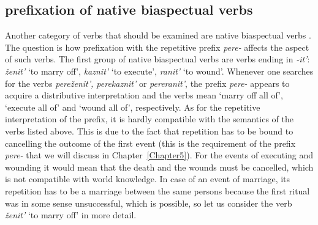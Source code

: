 \subsection{prefixation  of native biaspectual verbs  }\label{subsection:perf:native}
Another category of verbs that should be examined are native biaspectual verbs  . The question is how prefixation  with the repetitive  prefix \textit{pere-}   affects the aspect of such verbs. The first group of native biaspectual verbs   are verbs ending in \textit{-it'}: \textit{\v{z}enit'} `to marry off', \textit{kaznit'} `to execute', \textit{ranit'} `to wound'. Whenever one searches for the verbs \textit{pere\v{z}enit', perekaznit'} or \textit{pereranit'}, the prefix \textit{pere-}   appears to acquire a distributive  interpretation and the verbs mean `marry off all of', `execute all of' and `wound all of', respectively. As for the repetitive  interpretation of the prefix, it is hardly compatible with the semantics of the verbs listed above. This is due to the fact that repetition  has to be bound to cancelling the outcome of the first event (this is the requirement of the prefix \textit{pere-}   that we will discuss in Chapter~\ref{Chapter5}). For the events of executing and wounding it would mean that the death and the wounds must be cancelled, which is not compatible with world knowledge. In case of an event of marriage, its repetition  has to be a marriage between the same persons because the first ritual was in some sense unsuccessful, which is possible, so let us consider the verb \textit{\v{z}enit'} `to marry off' in more detail. 

